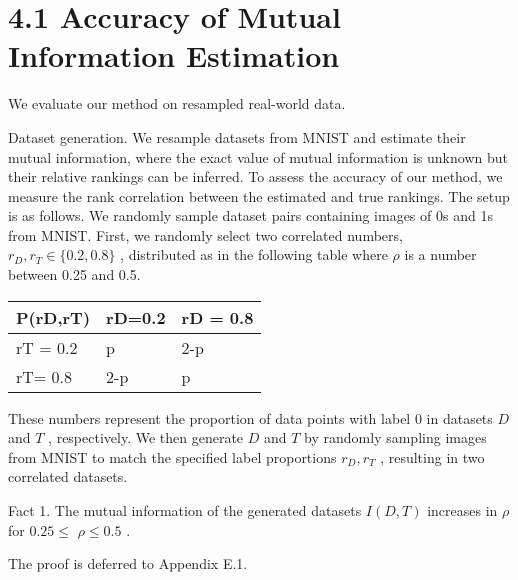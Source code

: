 \section{4.1 Accuracy of Mutual Information
Estimation}\label{accuracy-of-mutual-information-estimation}

We evaluate our method on resampled real-world data.

Dataset generation. We resample datasets from MNIST and estimate their
mutual information, where the exact value of mutual information is
unknown but their relative rankings can be inferred. To assess the
accuracy of our method, we measure the rank correlation between the
estimated and true rankings. The setup is as follows. We randomly sample
dataset pairs containing images of 0s and 1s from MNIST. First, we
randomly select two correlated numbers,
\(r _ { D } , r _ { T } \in \{ 0 . 2 , 0 . 8 \}\) , distributed as in
the following table where \(\rho\) is a number between 0.25 and 0.5.

\begin{longtable}[]{@{}|l|l|l|@{}}
\toprule\noalign{}
\endhead
\bottomrule\noalign{}
\endlastfoot
\hline
P(rD,rT) & rD=0.2 & rD = 0.8 \\
\hline
rT = 0.2 & p & 2-p \\
\hline
rT= 0.8 & 2-p & p \\
\hline
\end{longtable}

These numbers represent the proportion of data points with label 0 in
datasets \(D\) and \(T\) , respectively. We then generate \(D\) and
\(T\) by randomly sampling images from MNIST to match the specified
label proportions \(r _ { D } , r _ { T }\) , resulting in two
correlated datasets.

Fact 1. The mutual information of the generated datasets \(I ( D , T )\)
increases in \(\rho\) for \(0 . 2 5 \leq\) \(\rho \leq 0 . 5\) .

The proof is deferred to Appendix E.1.


